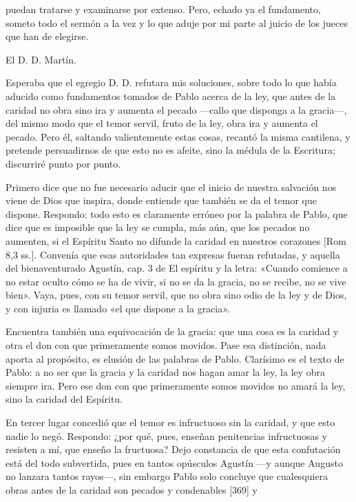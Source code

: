 puedan tratarse y examinarse por extenso. Pero, echado ya el fundamento, someto todo el sermón a la vez y lo que aduje por mi parte al juicio de los jueces que han de elegirse.

El D. D. Martín.

Esperaba que el egregio D. D. refutara mis soluciones, sobre todo lo que había aducido como fundamentos tomados de Pablo acerca de la ley, que antes de la caridad no obra sino ira y aumenta el pecado —callo que disponga a la gracia—, del mismo modo que el temor servil, fruto de la ley, obra ira y aumenta el pecado. Pero él, saltando valientemente estas cosas, recantó la misma cantilena, y pretende persuadirnos de que esto no es afeite, sino la médula de la Escritura; discurriré punto por punto.

Primero dice que no fue necesario aducir que el inicio de nuestra salvación nos viene de Dios que inspira, donde entiende que también se da el temor que dispone. Respondo: todo esto es claramente erróneo por la palabra de Pablo, que dice que es imposible que la ley se cumpla, más aún, que los pecados no aumenten, si el Espíritu Santo no difunde la caridad en nuestros corazones [Rom 8,3 ss.]. Convenía que esas autoridades tan expresas fueran refutadas, y aquella del bienaventurado Agustín, cap. 3 de El espíritu y la letra: «Cuando comience a no estar oculto cómo se ha de vivir, si no se da la gracia, no se recibe, no se vive bien». Vaya, pues, con su temor servil, que no obra sino odio de la ley y de Dios, y con injuria es llamado «el que dispone a la gracia».

Encuentra también una equivocación de la gracia: que una cosa es la caridad y otra el don con que primeramente somos movidos. Pase esa distinción, nada aporta al propósito, es elusión de las palabras de Pablo. Clarísimo es el texto de Pablo: a no ser que la gracia y la caridad nos hagan amar la ley, la ley obra siempre ira. Pero ese don con que primeramente somos movidos no amará la ley, sino la caridad del Espíritu.

En tercer lugar concedió que el temor es infructuoso sin la caridad, y que esto nadie lo negó. Respondo: ¿por qué, pues, enseñan penitencias infructuosas y resisten a mí, que enseño la fructuosa? Dejo constancia de que esta confutación está del todo subvertida, pues en tantos opúsculos Agustín —y aunque Augusto no lanzara tantos rayos—, sin embargo Pablo solo concluye que cualesquiera obras antes de la caridad son pecados y condenables [369] y

